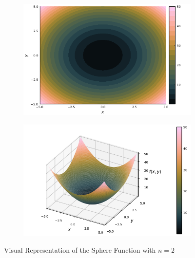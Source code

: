   \begin{figure}[ht!]
    \centering
    \begin{subfigure}[b]{0.4\textwidth}
      \centering
      \includegraphics[width=\textwidth]{img/test_functions/sphere_contour.png}
    \end{subfigure}
    \hfill
    \begin{subfigure}[b]{0.4\textwidth}
      \centering
      \includegraphics[width=\textwidth]{img/test_functions/sphere_surface.png}
    \end{subfigure}
    \caption{Visual Representation of the Sphere Function with \(n = 2\)}
    \label{fig:app:test:sphere}
  \end{figure}
